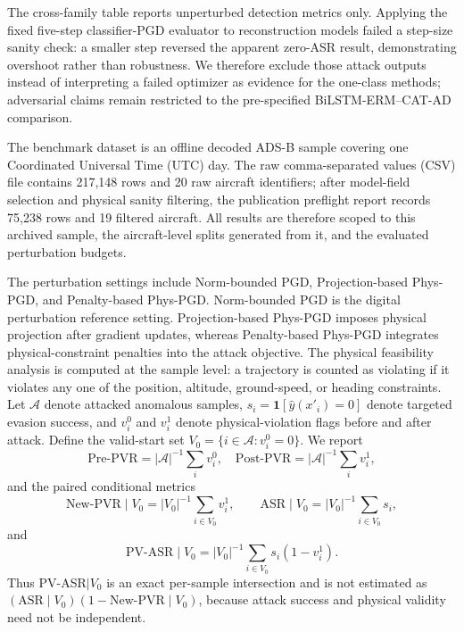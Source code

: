 \documentclass[runningheads]{llncs}
\begin{document}
The cross-family table reports unperturbed detection metrics only.
Applying the fixed five-step classifier-PGD evaluator to reconstruction models failed a step-size sanity check: a smaller step reversed the apparent zero-ASR result, demonstrating overshoot rather than robustness.
We therefore exclude those attack outputs instead of interpreting a failed optimizer as evidence for the one-class methods; adversarial claims remain restricted to the pre-specified BiLSTM-ERM--CAT-AD comparison.

The benchmark dataset is an offline decoded ADS-B sample covering one Coordinated Universal Time (UTC) day.
The raw comma-separated values (CSV) file contains 217,148 rows and 20 raw aircraft identifiers; after model-field selection and physical sanity filtering, the publication preflight report records 75,238 rows and 19 filtered aircraft.
All results are therefore scoped to this archived sample, the aircraft-level splits generated from it, and the evaluated perturbation budgets.

The perturbation settings include Norm-bounded PGD, Projection-based Phys-PGD, and Penalty-based Phys-PGD.
Norm-bounded PGD is the digital perturbation reference setting.
Projection-based Phys-PGD imposes physical projection after gradient updates, whereas Penalty-based Phys-PGD integrates physical-constraint penalties into the attack objective.
The physical feasibility analysis is computed at the sample level: a trajectory is counted as violating if it violates any one of the position, altitude, ground-speed, or heading constraints.
Let $\mathcal{A}$ denote attacked anomalous samples, $s_i=\mathbf{1}[\hat{y}(x'_i)=0]$ denote targeted evasion success, and $v_i^0$ and $v_i^1$ denote physical-violation flags before and after attack.
Define the valid-start set $V_0=\{i\in\mathcal{A}:v_i^0=0\}$.
We report
\begin{equation}
\mathrm{Pre\text{-}PVR}=|\mathcal{A}|^{-1}\sum_i v_i^0,
\quad
\mathrm{Post\text{-}PVR}=|\mathcal{A}|^{-1}\sum_i v_i^1,
\end{equation}
and the paired conditional metrics
\begin{equation}
\mathrm{New\text{-}PVR}\mid V_0 = |V_0|^{-1}\sum_{i\in V_0}v_i^1,
\qquad
\mathrm{ASR}\mid V_0 = |V_0|^{-1}\sum_{i\in V_0}s_i,
\end{equation}
and
\begin{equation}
\mathrm{PV\text{-}ASR}\mid V_0 = |V_0|^{-1}\sum_{i\in V_0}s_i(1-v_i^1).
\end{equation}
Thus PV-ASR$\mid V_0$ is an exact per-sample intersection and is not estimated as $(\mathrm{ASR}\mid V_0)(1-\mathrm{New\text{-}PVR}\mid V_0)$, because attack success and physical validity need not be independent.
\end{document}

